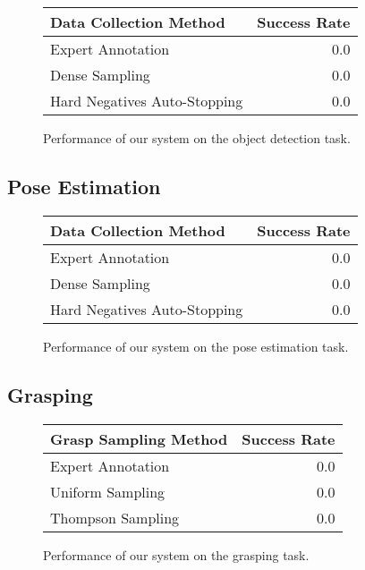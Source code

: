 \documentclass[conference]{IEEEtran}
\begin{document}
\begin{figure}
  \begin{center}
  \begin{tabular}{|l|r|}
  \hline
  Data Collection Method & Success Rate \\ \hline
  Expert Annotation & 0.0 \\ \hline
  Dense Sampling & 0.0 \\ \hline
  Hard Negatives Auto-Stopping & 0.0 \\ \hline
  \end{tabular}
  \caption{Performance of our system on the object detection task.}
  \end{center}
\end{figure}

\subsection{Pose Estimation}

\begin{figure}
  \begin{center}
  \begin{tabular}{|l|r|}
  \hline
  Data Collection Method & Success Rate \\ \hline
  Expert Annotation & 0.0 \\ \hline
  Dense Sampling & 0.0 \\ \hline
  Hard Negatives Auto-Stopping & 0.0 \\ \hline
  \end{tabular}
  \caption{Performance of our system on the pose estimation task.}
  \end{center}
\end{figure}

\subsection{Grasping}

\begin{figure}
  \begin{center}
  \begin{tabular}{|l|r|}
  \hline
  Grasp Sampling Method & Success Rate \\ \hline
  Expert Annotation & 0.0 \\ \hline
  Uniform Sampling & 0.0 \\ \hline
  Thompson Sampling & 0.0 \\ \hline
  \end{tabular}
  \caption{Performance of our system on the grasping task.}
  \end{center}
\end{figure}
\end{document}
